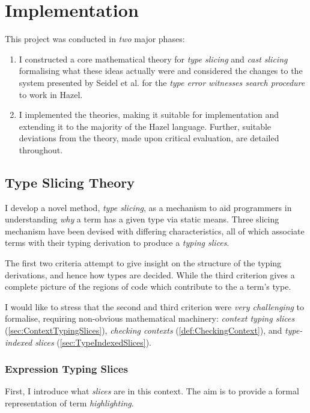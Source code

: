 \chapter{Implementation}\label{chap:Implementation}
This project was conducted in \textit{two} major phases:
\begin{enumerate}
\item I constructed a core mathematical theory for \textit{type slicing} and \textit{cast slicing} formalising what these ideas actually were and considered the changes to the system presented by Seidel et al. for the \textit{type error witnesses search procedure} to work in Hazel.  

\item I implemented the theories, making it suitable for implementation and extending it to the majority of the Hazel language. Further, suitable deviations from the theory, made upon critical evaluation, are detailed throughout.
\end{enumerate}

\section{Type Slicing Theory}\label{sec:TypeSlicingTheory}

I develop a novel method, \textit{type slicing}, as a mechanism to aid programmers in understanding \textit{why} a term has a given type via static means. Three slicing mechanism have been devised with differing characteristics, all of which associate terms with their typing derivation to produce a \textit{typing slices}. 

The first two criteria attempt to give insight on the structure of the typing derivations, and hence how types are decided. While the third criterion gives a complete picture of the regions of code which contribute to the a term's type.

I would like to stress that the second and third criterion were \textit{very challenging} to formalise, requiring non-obvious mathematical machinery: \textit{context typing slices} (\cref{sec:ContextTypingSlices}), \textit{checking contexts} (\cref{def:CheckingContext}), and \textit{type-indexed slices} (\cref{sec:TypeIndexedSlices}).

\subsection{Expression Typing Slices}\label{sec:ExpressionTypingSlices}
First, I introduce what \textit{slices} are in this context. The aim is to provide a formal representation of term \textit{highlighting}. 

